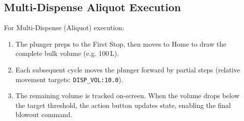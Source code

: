 \documentclass[11pt,a4paper]{article}
\begin{document}
\subsection{Multi-Dispense Aliquot Execution}
For Multi-Dispense (Aliquot) execution:
\begin{enumerate}
    \item The plunger preps to the First Stop, then moves to Home to draw the complete bulk volume (e.g. 100\,\textmu L).
    \item Each subsequent cycle moves the plunger forward by partial steps (relative movement targets: \texttt{DISP\_VOL:10.0}).
    \item The remaining volume is tracked on-screen. When the volume drops below the target threshold, the action button updates state, enabling the final blowout command.
\end{enumerate}

\newpage
\printindex
\end{document}

